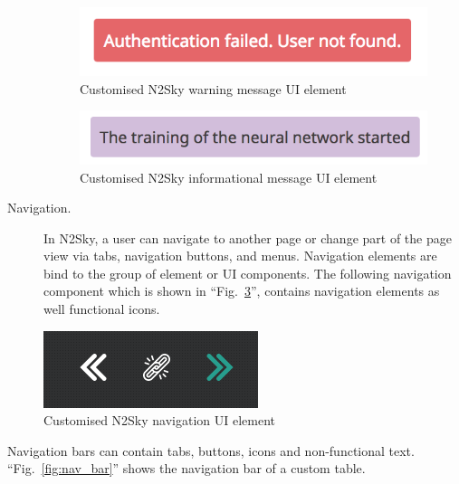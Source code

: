 \begin{description}
\begin{figure}[htbp]
\begin{center}
  \includegraphics[scale=0.65]{components/3/components/notif_warning.png}
  \caption{Customised N2Sky warning message UI element}
  \label{fig:notif_warning}
\end{center}
\end{figure}

\begin{figure}[htbp]
\begin{center}
  \includegraphics[scale=0.65]{components/3/components/notif_info.png}
  \caption{Customised N2Sky informational message UI element}
  \label{fig:notif_info}
\end{center}
\end{figure}

\item[Navigation.] In N2Sky, a user can navigate to another page or change part of the page view via tabs, navigation buttons, and menus. 
Navigation elements are bind to the group of element or UI components. The following navigation component which is shown in ``Fig.~\ref{fig:nav}'', contains navigation elements as well functional icons. 
\end{description}

\begin{figure}[htbp]
\begin{center}
  \includegraphics[scale=0.65]{components/3/components/nav.png}
  \caption{Customised N2Sky navigation UI element}
  \label{fig:nav}
\end{center}
\end{figure}

Navigation bars can contain tabs, buttons, icons and non-functional text. ``Fig.~\ref{fig:nav_bar}'' shows the navigation bar of a custom table. 

